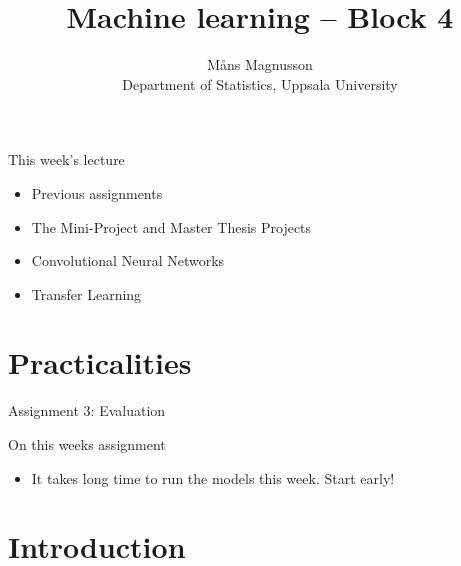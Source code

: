 \documentclass[10pt]{beamer}
\title[]{{\color{black}Machine learning -- Block 4}}
\author[]{M{\aa}ns Magnusson\\Department of Statistics, Uppsala University}
\date{\currentsemester}
\begin{document}
\frame{\titlepage
}



\begin{frame}{This week's lecture}
\begin{itemize}
\item Previous assignments
\item The Mini-Project and Master Thesis Projects
\item Convolutional Neural Networks
\item Transfer Learning
\end{itemize}
\end{frame}




\section{Practicalities}

\begin{frame}{Assignment 3: Evaluation}


\end{frame}

\begin{frame}{On this weeks assignment}
\begin{itemize}
\item It takes long time to run the models this week. Start early!
\end{itemize}
\end{frame}


\section{Introduction}
\frame{\sectionpage}
\end{document}
